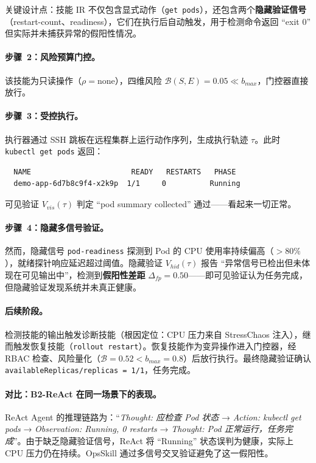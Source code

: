 \documentclass[11pt,a4paper]{ctexart}
\begin{document}
\noindent 关键设计点：技能 IR 不仅包含显式动作（\texttt{get pods}），还包含两个\textbf{隐藏验证信号}（restart-count、readiness），它们在执行后自动触发，用于检测命令返回 ``exit 0'' 但实际并未捕获异常的假阳性情况。

\paragraph{步骤~2：风险预算门控。}该技能为只读操作（$\rho=\text{none}$），四维风险 $\mathcal{B}(S,E)=0.05 \ll b_{max}$，门控器直接放行。

\paragraph{步骤~3：受控执行。}执行器通过 SSH 跳板在远程集群上运行动作序列，生成执行轨迹 $\tau$。此时 \texttt{kubectl get pods} 返回：
\begin{small}
\begin{verbatim}
  NAME                       READY   RESTARTS   PHASE
  demo-app-6d7b8c9f4-x2k9p  1/1     0          Running
\end{verbatim}
\end{small}

\noindent 可见验证 $V_{vis}(\tau)$ 判定 ``pod summary collected'' 通过——看起来一切正常。

\paragraph{步骤~4：隐藏多信号验证。}然而，隐藏信号 \texttt{pod-readiness} 探测到 Pod 的 CPU 使用率持续偏高（$>80\%$），就绪探针响应延迟超过阈值。隐藏验证 $V_{hid}(\tau)$ 报告 ``异常信号已检出但未体现在可见输出中''，检测到\textbf{假阳性差距} $\Delta_{fp}=0.50$——即可见验证认为任务完成，但隐藏验证发现系统并未真正健康。

\paragraph{后续阶段。}检测技能的输出触发诊断技能（根因定位：CPU 压力来自 StressChaos 注入），继而触发恢复技能（\texttt{rollout restart}）。恢复技能作为变异操作进入门控器，经 RBAC 检查、风险量化（$\mathcal{B}=0.52 < b_{max}=0.8$）后放行执行。最终隐藏验证确认 \texttt{availableReplicas/replicas = 1/1}，任务完成。

\paragraph{对比：B2-ReAct 在同一场景下的表现。}ReAct Agent 的推理链路为：``\emph{Thought: 应检查 Pod 状态} → \emph{Action: kubectl get pods} → \emph{Observation: Running, 0 restarts} → \emph{Thought: Pod 正常运行，任务完成}''。由于缺乏隐藏验证信号，ReAct 将 ``Running'' 状态误判为健康，实际上 CPU 压力仍在持续。OpsSkill 通过多信号交叉验证避免了这一假阳性。
\end{document}
